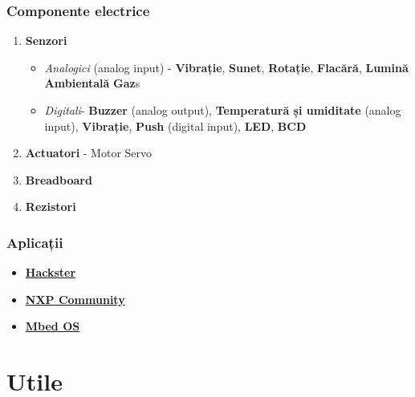 \documentclass[xcolor={table}]{beamer}
\begin{document}
		\begin{frame}
			\frametitle{Componente electrice}
			\begin{enumerate}
				\item \textbf{Senzori}
					\begin{itemize}
				        \item \textit{Analogici} (analog input) - 
				        \textbf{Vibrație},
				        \textbf{Sunet}, 
				        \textbf{Rotație}, 
				        \textbf{Flacără}, 
				        \textbf{Lumină Ambientală}
				        \textbf{Gaz}s
				        \item \textit{Digitali}-
				        \textbf{Buzzer} (analog output),
				        \textbf{Temperatură și umiditate} (analog input),
				        \textbf{Vibrație}, 
				        \textbf{Push} (digital input),
				        \textbf{LED},
				        \textbf{BCD} 
			        \end{itemize}
			    \item \textbf{Actuatori} - Motor Servo
				\item \textbf{Breadboard}
				\item \textbf{Rezistori}
			\end{enumerate}
		\end{frame}
		
		\begin{frame}
    		\frametitle{Aplicații}
    			\begin{itemize}
        			\item \href{https://www.hackster.io/projects/tags/microcontroller}{\textbf{Hackster}}
        			\item \href{https://community.nxp.com/}{\textbf{NXP Community}}
        			\item \href{https://os.mbed.com/platforms/KL25Z/}{\textbf{Mbed OS}}
    		    \end{itemize}
    	\end{frame}
	
	\section{Utile}
		
\end{document}
